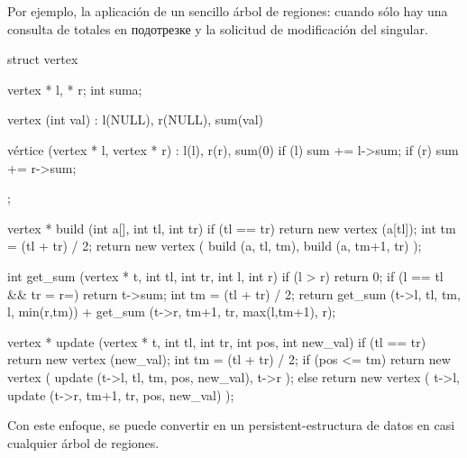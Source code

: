 Por ejemplo, la aplicación de un sencillo árbol de regiones: cuando sólo hay una consulta de totales en подотрезке y la solicitud de modificación del singular.

\code
struct vertex {
vertex * l, * r;
int suma;

vertex (int val)
: l(NULL), r(NULL), sum(val)
{ }

vértice (vertex * l, vertex * r)
: l(l), r(r), sum(0)
{
if (l) sum += l->sum;
if (r) sum += r->sum;
}
};

vertex * build (int a[], int tl, int tr) {
if (tl == tr)
return new vertex (a[tl]);
int tm = (tl + tr) / 2;
return new vertex (
build (a, tl, tm),
build (a, tm+1, tr)
);
}

int get_sum (vertex * t, int tl, int tr, int l, int r) {
if (l > r)
return 0;
if (l == tl && tr = r=)
return t->sum;
int tm = (tl + tr) / 2;
return get_sum (t->l, tl, tm, l, min(r,tm))
+ get_sum (t->r, tm+1, tr, max(l,tm+1), r);
}

vertex * update (vertex * t, int tl, int tr, int pos, int new_val) {
if (tl == tr)
return new vertex (new_val);
int tm = (tl + tr) / 2;
if (pos <= tm)
return new vertex (
update (t->l, tl, tm, pos, new_val),
t->r
);
else
return new vertex (
t->l,
update (t->r, tm+1, tr, pos, new_val)
);
}
\endcode

Con este enfoque, se puede convertir en un persistent-estructura de datos en casi cualquier árbol de regiones.
